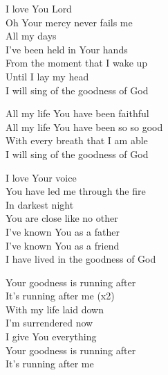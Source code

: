 \documentclass[aspectratio=169]{beamer}
\begin{document}
{\begin{frame}{}
I love You Lord\\ 
Oh Your mercy never fails me\\ 
All my days\\ 
I've been held in Your hands\\ 
From the moment that I wake up\\ 
Until I lay my head\\ 
I will sing of the goodness of God

\end{frame}
\hypertarget{Goodness of God['All my life You have been faithful']C}{}
\begin{frame}{}
\fontsize{21.428571428571427}{25.71428571428571}\selectfont

All my life You have been faithful\\ 
All my life You have been so so good\\ 
With every breath that I am able\\ 
I will sing of the goodness of God

\end{frame}
\hypertarget{Goodness of God['All my life You have been faithful']2}{}
\begin{frame}{}
\fontsize{21.428571428571427}{25.71428571428571}\selectfont

I love Your voice\\ 
You have led me through the fire\\ 
In darkest night\\ 
You are close like no other\\ 
I've known You as a father\\ 
I've known You as a friend\\ 
I have lived in the goodness of God

\end{frame}
\hypertarget{Goodness of God['All my life You have been faithful']Br}{}
\begin{frame}{}
\fontsize{21.428571428571427}{25.71428571428571}\selectfont

Your goodness is running after\\ 
It’s running after me (x2)\\ 
With my life laid down\\ 
I’m surrendered now\\ 
I give You everything\\ 
Your goodness is running after\\ 
It's running after me

\end{frame}
}
\end{document}

